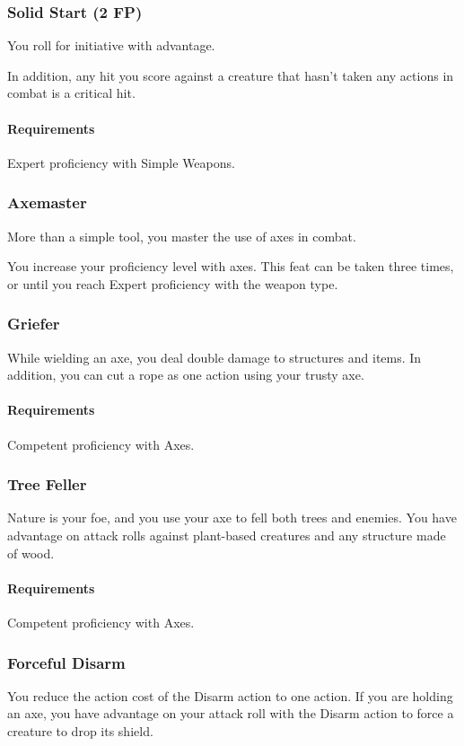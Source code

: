 \subsubsection{Solid Start (2 FP)} \label{feat::solidstart}
    You roll for initiative with advantage.

    In addition, any hit you score against a creature that hasn't taken any actions in combat is a critical hit.
    \paragraph{Requirements} Expert proficiency with Simple Weapons.

\subsubsection{Axemaster} \label{feat::axemaster}
    More than a simple tool, you master the use of axes in combat.

    You increase your proficiency level with axes.
    This feat can be taken three times, or until you reach Expert proficiency with the weapon type.
\subsubsection{Griefer} \label{feat::griefer}
    While wielding an axe, you deal double damage to structures and items.
    In addition, you can cut a rope as one action using your trusty axe.
    \paragraph{Requirements} Competent proficiency with Axes.
\subsubsection{Tree Feller} \label{feat::treefeller}
    Nature is your foe, and you use your axe to fell both trees and enemies.
    You have advantage on attack rolls against plant-based creatures and any structure made of wood.
    \paragraph{Requirements} Competent proficiency with Axes.
\subsubsection{Forceful Disarm} \label{feat::forcefuldisarm}
    You reduce the action cost of the Disarm action to one action.
    If you are holding an axe, you have advantage on your attack roll with the Disarm action to force a creature to drop its shield.
